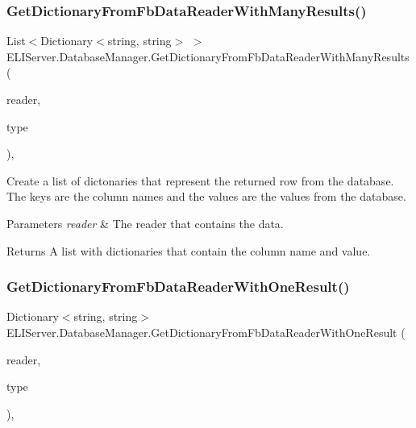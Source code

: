 \subsubsection{\texorpdfstring{Get\+Dictionary\+From\+Fb\+Data\+Reader\+With\+Many\+Results()}{GetDictionaryFromFbDataReaderWithManyResults()}}
{\footnotesize\ttfamily List$<$Dictionary$<$string, string$>$ $>$ E\+L\+I\+Server.\+Database\+Manager.\+Get\+Dictionary\+From\+Fb\+Data\+Reader\+With\+Many\+Results (\begin{DoxyParamCaption}\item[{Fb\+Data\+Reader}]{reader,  }\item[{String}]{type }\end{DoxyParamCaption})\hspace{0.3cm}{\ttfamily [inline]}, {\ttfamily [private]}}



Create a list of dictonaries that represent the returned row from the database. The keys are the column names and the values are the values from the database. 


\begin{DoxyParams}{Parameters}
{\em reader} & The reader that contains the data.\\
\hline
\end{DoxyParams}
\begin{DoxyReturn}{Returns}
A list with dictionaries that contain the column name and value.
\end{DoxyReturn}
\mbox{\label{class_e_l_i_server_1_1_database_manager_a4ccfa58357d3f8e7fd495f78a117856e}} 
\subsubsection{\texorpdfstring{Get\+Dictionary\+From\+Fb\+Data\+Reader\+With\+One\+Result()}{GetDictionaryFromFbDataReaderWithOneResult()}}
{\footnotesize\ttfamily Dictionary$<$string, string$>$ E\+L\+I\+Server.\+Database\+Manager.\+Get\+Dictionary\+From\+Fb\+Data\+Reader\+With\+One\+Result (\begin{DoxyParamCaption}\item[{Fb\+Data\+Reader}]{reader,  }\item[{String}]{type }\end{DoxyParamCaption})\hspace{0.3cm}{\ttfamily [inline]}, {\ttfamily [private]}}



